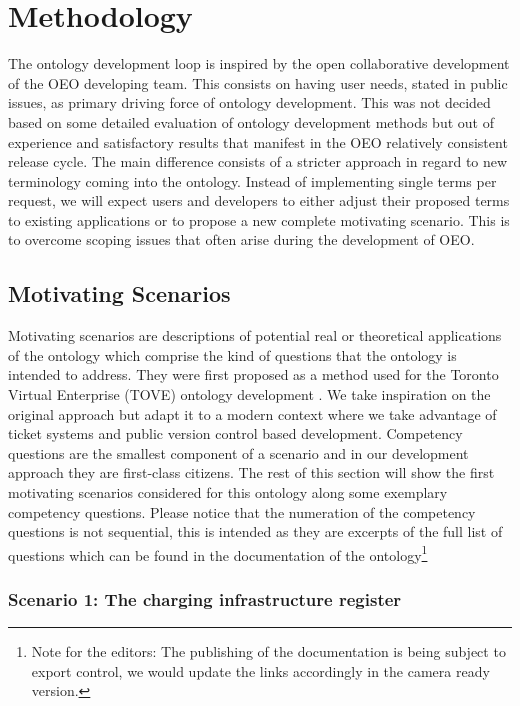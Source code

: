 ﻿\section{Methodology}
\label{methodology}

The ontology development loop is inspired by the open collaborative development
of the OEO developing team. This consists on having user needs, stated in
public issues, as primary driving force of ontology development. This was not
decided based on some detailed evaluation of ontology development methods but
out of experience and satisfactory results that manifest in the OEO relatively
consistent release cycle. The main difference consists of a stricter approach
in regard to new terminology coming into the ontology. Instead of implementing
single terms per request, we will expect users and developers to either adjust
their proposed terms to existing applications or to propose a new complete
motivating scenario. This is to overcome scoping issues that often arise during
the development of OEO. 


\subsection{Motivating Scenarios}

Motivating scenarios are descriptions of potential real or theoretical
applications of the ontology which comprise the kind of questions that the
ontology is intended to address.  They were first proposed as a method used for
the Toronto Virtual Enterprise (TOVE) ontology development
\cite{Gruninger.1995}. We take inspiration on the original approach but adapt
it to a modern context where we take advantage of ticket systems and public
version control based development. Competency questions are the smallest
component of a scenario and in our development approach they are first-class
citizens. The rest of this section will show the first motivating scenarios
considered for this ontology along some exemplary competency questions. Please
notice that the numeration of the competency questions is not sequential, this
is intended as they are excerpts of the full list of questions which can be
found in the documentation of the ontology\footnote{Note for the editors: The
publishing of the documentation is being subject to export control, we would
update the links accordingly in the camera ready version. }

\subsubsection*{Scenario 1: The charging infrastructure register}

